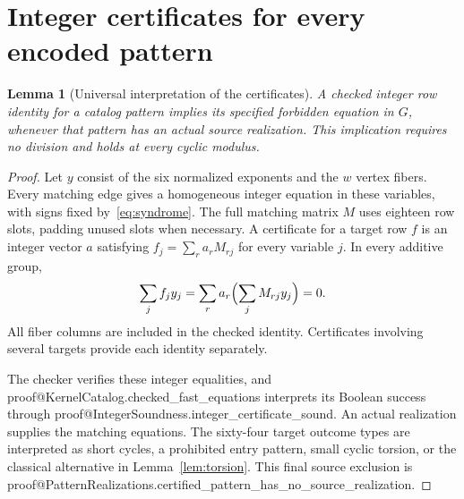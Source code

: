 \documentclass[11pt]{article}
\makeatletter
\newtheorem{lemma}[theorem]{Lemma}
\theoremstyle{definition}\newtheorem{definition}[theorem]{Definition}
\newcommand{\lean}[2]{\csname proof@#1.#2\endcsname}
\makeatother
\begin{document}
\section{Integer certificates for every encoded pattern}\label{sec:certificates}
\begin{lemma}[Universal interpretation of the certificates]\label{lem:cert}
A checked integer row identity for a catalog pattern implies its specified
forbidden equation in $G$, whenever that pattern has an actual source
realization. This implication requires no division and holds at every cyclic
modulus.
\end{lemma}
\begin{proof}
Let $y$ consist of the six normalized exponents and the $w$ vertex fibers.
Every matching edge gives a homogeneous integer equation in these variables,
with signs fixed by~\eqref{eq:syndrome}. The full matching matrix $M$ uses
eighteen row slots, padding unused slots when necessary. A certificate for
a target row $f$ is an integer vector $a$ satisfying
$f_j=\sum_r a_rM_{rj}$ for every variable $j$. In every additive group,
\[
 \sum_j f_j y_j=\sum_r a_r\Bigl(\sum_j M_{rj}y_j\Bigr)=0.
\]
All fiber columns are included in the checked identity. Certificates involving
several targets provide each identity separately.

The checker verifies these integer equalities, and
\lean{KernelCatalog}{checked_fast_equations} interprets its Boolean success
through \lean{IntegerSoundness}{integer_certificate_sound}.
An actual realization supplies the matching equations. The sixty-four target
outcome types are interpreted as short cycles, a prohibited entry pattern,
small cyclic torsion, or the classical alternative in Lemma~\ref{lem:torsion}.
This final source exclusion is
\lean{PatternRealizations}{certified_pattern_has_no_source_realization}.
\end{proof}
\end{document}
